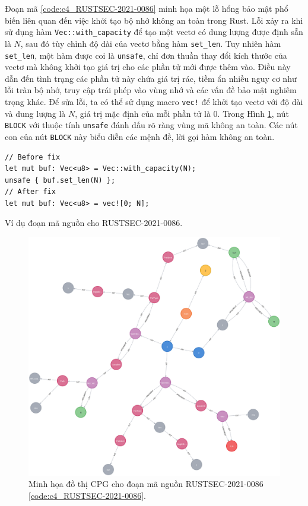 Đoạn mã \ref{code:c4_RUSTSEC-2021-0086} minh họa một lỗ hổng bảo mật phổ biến liên quan đến việc khởi tạo bộ nhớ không an toàn trong Rust.
Lỗi xảy ra khi sử dụng hàm \texttt{Vec::with\_capacity} để tạo một vectơ có dung lượng được định sẵn là $N$, sau đó tùy chỉnh độ dài của vectơ bằng hàm \texttt{set\_len}.
Tuy nhiên hàm \texttt{set\_len}, một hàm được coi là \texttt{unsafe}, chỉ đơn thuần thay đổi kích thước của vectơ mà không khởi tạo giá trị cho các phần tử mới được thêm vào.
Điều này dẫn đến tình trạng các phần tử này chứa giá trị rác, tiềm ẩn nhiều nguy cơ như lỗi tràn bộ nhớ, truy cập trái phép vào vùng nhớ và các vấn đề bảo mật nghiêm trọng khác.
Để sửa lỗi, ta có thể sử dụng macro \texttt{vec!} để khởi tạo vectơ với độ dài và dung lượng là $N$, giá trị mặc định của mỗi phần tử là $0$.
Trong Hình \ref{img:c4_RUSTSEC-2021-0086}, nút \texttt{BLOCK} với thuộc tính \texttt{unsafe} đánh dấu rõ ràng vùng mã không an toàn.
Các nút con của nút \texttt{BLOCK} này biểu diễn các mệnh đề, lời gọi hàm không an toàn.

\begin{listing}[H]
\begin{verbatim}
// Before fix
let mut buf: Vec<u8> = Vec::with_capacity(N);
unsafe { buf.set_len(N) };
// After fix
let mut buf: Vec<u8> = vec![0; N];
\end{verbatim}
\caption{Ví dụ đoạn mã nguồn cho RUSTSEC-2021-0086.}
\label{code:c4_RUSTSEC-2021-0086}
\end{listing}

\begin{figure}[H]
    \includegraphics[width=1\columnwidth]{figures/c4/c4_RUSTSEC-2021-0086.png}
    \centering
    \caption{Minh họa đồ thị CPG cho đoạn mã nguồn RUSTSEC-2021-0086 \ref{code:c4_RUSTSEC-2021-0086}.}
    \label{img:c4_RUSTSEC-2021-0086}
\end{figure}

